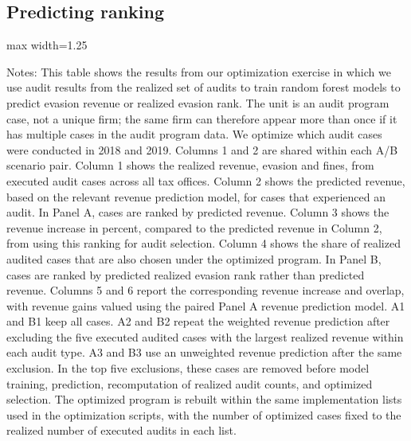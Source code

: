 \documentclass{article}
\newcommand{\OutPath}{Output/}%
\newcommand{\OutPath}{../Output/}%
\begin{document}
\subsection{Predicting ranking}

\begin{landscape}
\begin{table}[H]\centering
\begin{adjustbox}{max width=1.25\textwidth}
\begin{threeparttable}
\caption{Optimization Gains from Machine-Learning Algorithm Trained on Audit Outcome Data: Panel Revision}
\label{tab:table_opt_full_and_desk_unweighted_top5_revision}

\footnotesize


\begin{tablenotes}[flushleft]
\footnotesize
\item Notes: This table shows the results from our optimization exercise in which we use audit results from the realized set of audits to train random forest models to predict evasion revenue or realized evasion rank. The unit is an audit program case, not a unique firm; the same firm can therefore appear more than once if it has multiple cases in the audit program data. We optimize which audit cases were conducted in 2018 and 2019. Columns 1 and 2 are shared within each A/B scenario pair. Column 1 shows the realized revenue, evasion and fines, from executed audit cases across all tax offices. Column 2 shows the predicted revenue, based on the relevant revenue prediction model, for cases that experienced an audit. In Panel A, cases are ranked by predicted revenue. Column 3 shows the revenue increase in percent, compared to the predicted revenue in Column 2, from using this ranking for audit selection. Column 4 shows the share of realized audited cases that are also chosen under the optimized program. In Panel B, cases are ranked by predicted realized evasion rank rather than predicted revenue. Columns 5 and 6 report the corresponding revenue increase and overlap, with revenue gains valued using the paired Panel A revenue prediction model. A1 and B1 keep all cases. A2 and B2 repeat the weighted revenue prediction after excluding the five executed audited cases with the largest realized revenue within each audit type. A3 and B3 use an unweighted revenue prediction after the same exclusion. In the top five exclusions, these cases are removed before model training, prediction, recomputation of realized audit counts, and optimized selection. The optimized program is rebuilt within the same implementation lists used in the optimization scripts, with the number of optimized cases fixed to the realized number of executed audits in each list.
\end{tablenotes}
\end{threeparttable}
\end{adjustbox}
\end{table}
\end{landscape}
\end{document}
